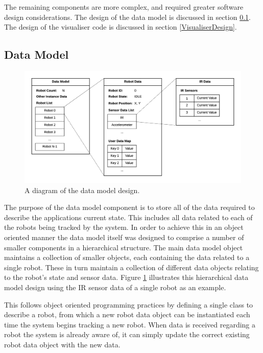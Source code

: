 The remaining components are more complex, and required greater software design considerations. The design of the data model is discussed in section \ref{DataModelDesign}. The design of the visualiser code is discussed in section \ref{VisualiserDesign}.

\subsection{Data Model} \label{DataModelDesign}
\begin{figure}[h]
	\centering
	\includegraphics[scale=0.7]{Figures/DataModel.png}
	\decoRule
	\caption[Data Model Diagram]{A diagram of the data model design.}
	\label{fig:DataModel}
\end{figure}

The purpose of the data model component is to store all of the data required to describe the applications current state. This includes all data related to each of the robots being tracked by the system. In order to achieve this in an object oriented manner the data model itself was designed to comprise a number of smaller components in a hierarchical structure. The main data model object maintains a collection of smaller objects, each containing the data related to a single robot. These in turn maintain a collection of different data objects relating to the robot's state and sensor data. Figure \ref{fig:DataModel} illustrates this hierarchical data model design using the IR sensor data of a single robot as an example.

This follows object oriented programming practices by defining a single class to describe a robot, from which a new robot data object can be instantiated each time the system begins tracking a new robot. When data is received regarding a robot the system is already aware of, it can simply update the correct existing robot data object with the new data.

